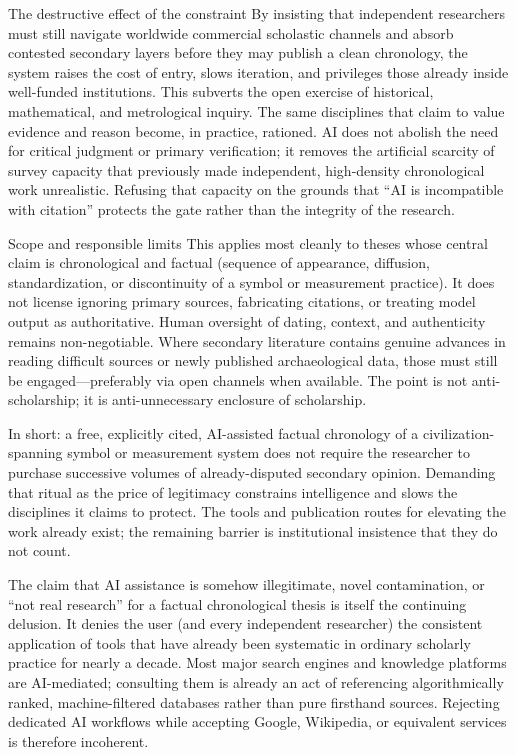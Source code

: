 The destructive effect of the constraint
By insisting that independent researchers must still navigate worldwide commercial scholastic channels and absorb contested secondary layers before they may publish a clean chronology, the system raises the cost of entry, slows iteration, and privileges those already inside well-funded institutions. This subverts the open exercise of historical, mathematical, and metrological inquiry. The same disciplines that claim to value evidence and reason become, in practice, rationed. AI does not abolish the need for critical judgment or primary verification; it removes the artificial scarcity of survey capacity that previously made independent, high-density chronological work unrealistic. Refusing that capacity on the grounds that “AI is incompatible with citation” protects the gate rather than the integrity of the research.

Scope and responsible limits
This applies most cleanly to theses whose central claim is chronological and factual (sequence of appearance, diffusion, standardization, or discontinuity of a symbol or measurement practice). It does not license ignoring primary sources, fabricating citations, or treating model output as authoritative. Human oversight of dating, context, and authenticity remains non-negotiable. Where secondary literature contains genuine advances in reading difficult sources or newly published archaeological data, those must still be engaged—preferably via open channels when available. The point is not anti-scholarship; it is anti-unnecessary enclosure of scholarship.

In short: a free, explicitly cited, AI-assisted factual chronology of a civilization-spanning symbol or measurement system does not require the researcher to purchase successive volumes of already-disputed secondary opinion. Demanding that ritual as the price of legitimacy constrains intelligence and slows the disciplines it claims to protect. The tools and publication routes for elevating the work already exist; the remaining barrier is institutional insistence that they do not count.

The claim that AI assistance is somehow illegitimate, novel contamination, or “not real research” for a factual chronological thesis is itself the continuing delusion. It denies the user (and every independent researcher) the consistent application of tools that have already been systematic in ordinary scholarly practice for nearly a decade. Most major search engines and knowledge platforms are AI-mediated; consulting them is already an act of referencing algorithmically ranked, machine-filtered databases rather than pure firsthand sources. Rejecting dedicated AI workflows while accepting Google, Wikipedia, or equivalent services is therefore incoherent.

